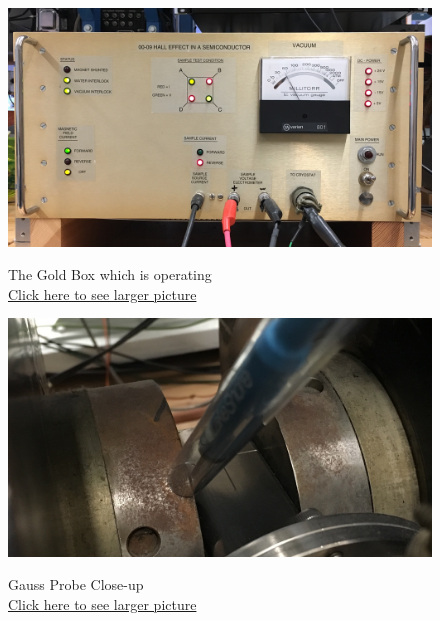 \documentclass{../lab}
\begin{document}
\begin{figure}[H]
\captionsetup{justification=centering}
  \href{http://experimentationlab.berkeley.edu/sites/default/files/images/SHEimageFrontPanel.jpg}{\includegraphics[width=\linewidth,keepaspectratio]{images/SHEimageFrontPanel.jpg}}
  \caption{The Gold Box which is operating\\ \href{http://experimentationlab.berkeley.edu/sites/default/files/images/SHEimageFrontPanel.jpg}{Click here to see larger picture}}
  \label{fig:GoldBox.jpg}
\endminipage\hfill
{}
  \href{http://experimentationlab.berkeley.edu/sites/default/files/images/SHEimageGaussProbe.jpg}{\includegraphics[width=\linewidth,keepaspectratio]{images/SHEimageGaussProbe.jpg}}
  \caption{Gauss Probe Close-up\\ \href{http://experimentationlab.berkeley.edu/sites/default/files/images/SHEimageGaussProbe.jpg}{Click here to see larger picture}}\label{fig:GaussProbe.jpg}
\endminipage\hfill
{}

\end{figure}
\end{document}
